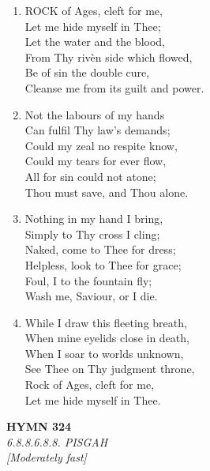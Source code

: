 \begin{enumerate}
    \item ROCK of Ages, cleft for me, \\
        Let me hide myself in Thee; \\
        Let the water and the blood, \\
        From Thy riv\`en side which flowed, \\
        Be of sin the double cure, \\
        Cleanse me from its guilt and power.

    \item Not the labours of my hands \\
        Can fulfil Thy law's demands; \\
        Could my zeal no respite know, \\
        Could my tears for ever flow, \\
        All for sin could not atone; \\
        Thou must save, and Thou alone.

    \item Nothing in my hand I bring, \\
        Simply to Thy cross I cling; \\
        Naked, come to Thee for dress; \\
        Helpless, look to Thee for grace; \\
        Foul, I to the fountain fly; \\
        Wash me, Saviour, or I die.

    \item While I draw this fleeting breath, \\
        When mine eyelids close in death, \\
        When I soar to worlds unknown, \\
        See Thee on Thy judgment throne, \\
        Rock of Ages, cleft for me, \\
        Let me hide myself in Thee.

\end{enumerate}

\newpage
\begin{center}
    {\Large \textbf{HYMN 324}}
    \\
    \textit{6.8.8.6.8.8. PISGAH}
    \\
    \textit{\small [Moderately fast]}
\end{center}
\vspace{1em}

